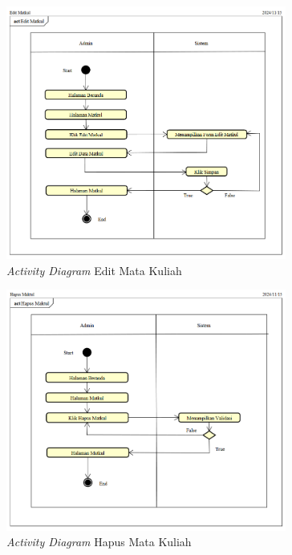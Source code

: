 \begin{figure}
	\centering
	\includegraphics[width=0.82\textwidth]{konten/gambar/activity-diagram/edit-matkul.png}
	\caption{\textit{Activity Diagram} Edit Mata Kuliah}
	\label{activity-diagram-edit-matkul}
\end{figure}

\begin{figure}
	\centering
	\includegraphics[width=0.82\textwidth]{konten/gambar/activity-diagram/hapus-matkul.png}
	\caption{\textit{Activity Diagram} Hapus Mata Kuliah}
	\label{activity-diagram-hapus-matkul}
\end{figure}

